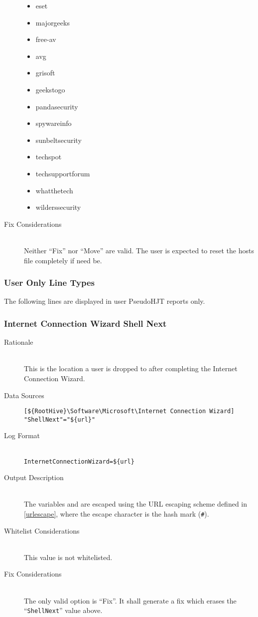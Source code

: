 \begin{description}
\begin{itemize}
  \item eset
  \item majorgeeks
  \item free-av
  \item avg
  \item grisoft
  \item geekstogo
  \item pandasecurity
  \item spywareinfo
  \item sunbeltsecurity
  \item techspot
  \item techsupportforum
  \item whatthetech
  \item wilderssecurity
\end{itemize}
\item[Fix Considerations] \hfill \\
Neither ``Fix'' nor ``Move'' are valid. The user is expected to reset the hosts
file completely if need be.
\end{description}

\subsubsection{User Only Line Types}
The following lines are displayed in user PseudoHJT reports only.

\subsubsection{Internet Connection Wizard Shell Next}
\begin{description}
\item[Rationale] \hfill \\
This is the location a user is dropped to after completing the Internet
Connection Wizard.
\item[Data Sources] \hfill
\vspace{-\baselineskip}
\begin{verbatim}
[${RootHive}\Software\Microsoft\Internet Connection Wizard]
"ShellNext"="${url}"
\end{verbatim}
\item[Log Format] \hfill \\
\verb|InternetConnectionWizard=${url}|
\item[Output Description] \hfill \\
The variables  and  are escaped using the URL escaping
scheme defined in \ref{urlescape}, where the escape character is the hash mark
(\verb|#|).
\item[Whitelist Considerations] \hfill \\
This value is not whitelisted.
\item[Fix Considerations] \hfill \\
The only valid option is ``Fix''. It shall generate a fix which erases the
``\verb|ShellNext|'' value above.
\end{description}

